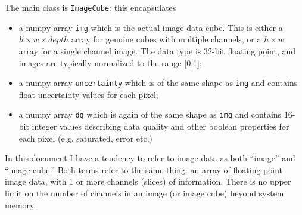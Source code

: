 The main class is \texttt{ImageCube}: this encapsulates
\begin{itemize}
\item a numpy array
\texttt{img}
which is the actual image data cube. This is either a 
$h \times w \times depth$ array for genuine cubes with multiple channels,
or a $h \times w$ array for a single channel image. The data type is 32-bit floating
point, and images are typically normalized to the range [0,1];
\item a numpy array \texttt{uncertainty} which is of the same shape as 
\texttt{img} and contains float uncertainty values for each pixel;
\item a numpy array \texttt{dq} which is again of the same shape as 
\texttt{img} and contains 16-bit integer values describing data quality and
other boolean
properties for each pixel (e.g. saturated, error etc.)
\end{itemize}

\begin{notebox}
In this document I have a tendency to refer to image data as both ``image'' and ``image cube.''
Both terms refer to the same thing: an array of floating point image data, with 1 or more channels (slices)
of information. There is no upper limit on the number of channels in an image (or image cube)
beyond system memory.
\end{notebox}

